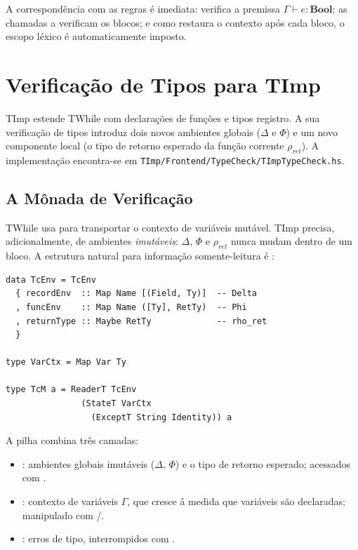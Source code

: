 A correspondência com as regras é imediata:
 verifica a premissa \(\Gamma \vdash
e : \mathbf{Bool}\); as chamadas a 
verificam os blocos; e como 
restaura o contexto após cada bloco, o escopo léxico é automaticamente imposto.

\section{Verificação de Tipos para TImp}

TImp estende TWhile com declarações de funções e tipos registro. A
sua verificação de tipos introduz dois novos ambientes globais
(\(\Delta\) e \(\Phi\)) e um novo componente local (o tipo de retorno
esperado da função corrente \(\rho_{\mathit{ret}}\)). A implementação
encontra-se em \verb|TImp/Frontend/TypeCheck/TImpTypeCheck.hs|.

\subsection{A Mônada de Verificação}

TWhile usa  para
transportar o contexto de variáveis mutável. TImp precisa, adicionalmente,
de ambientes \emph{imutáveis}: \(\Delta\), \(\Phi\) e
\(\rho_{\mathit{ret}}\) nunca mudam dentro de um bloco. A estrutura
natural para informação somente-leitura é :

\begin{verbatim}
data TcEnv = TcEnv
  { recordEnv  :: Map Name [(Field, Ty)]  -- Delta
  , funcEnv    :: Map Name ([Ty], RetTy)  -- Phi
  , returnType :: Maybe RetTy             -- rho_ret
  }

type VarCtx = Map Var Ty

type TcM a = ReaderT TcEnv
               (StateT VarCtx
                 (ExceptT String Identity)) a
\end{verbatim}

A pilha combina três camadas:

\begin{itemize}
  \item {}: ambientes globais imutáveis
    (\(\Delta\), \(\Phi\)) e o tipo de retorno esperado; acessados com
    .
  \item {}: contexto de variáveis \(\Gamma\),
    que cresce à medida que variáveis são declaradas; manipulado com
    /.
  \item {}: erros de tipo, interrompidos com
    .
\end{itemize}

